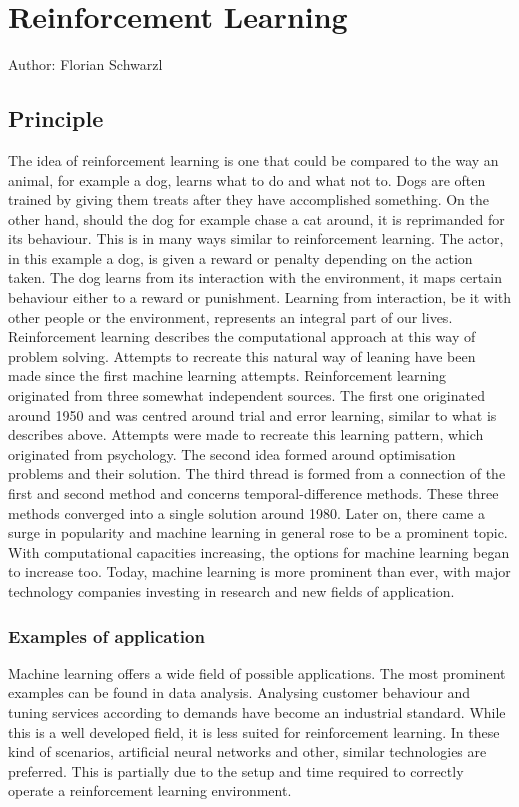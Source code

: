 \chapter{Reinforcement Learning}
Author: Florian Schwarzl

\section{Principle}
The idea of reinforcement learning is one that could be compared to the way an animal, for example a dog, learns what to do and what not to. Dogs are often trained by giving them treats after they have accomplished something. On the other hand, should the dog for example chase a cat around, it is reprimanded for its behaviour. This is in many ways similar to reinforcement learning. The actor, in this example a dog, is given a reward or penalty depending on the action taken. The dog learns from its interaction with the environment, it maps certain behaviour either to a reward or punishment. Learning from interaction, be it with other people or the environment, represents an integral part of our lives. Reinforcement learning describes the computational approach at this way of problem solving. Attempts to recreate this natural way of leaning have been made since the first machine learning attempts. Reinforcement learning originated from three somewhat independent sources. The first one originated around 1950 and was centred around trial and error learning, similar to what is describes above. Attempts were made to recreate this learning pattern, which originated from psychology. The second idea formed around optimisation problems and their solution. The third thread is formed from a connection of the first and second method and concerns temporal-difference methods. These three methods converged into a single solution around 1980. Later on, there came a surge in popularity and machine learning in general rose to be a prominent topic. With computational capacities increasing, the options for machine learning began to increase too. Today, machine learning is more prominent than ever, with major technology companies investing in research and new fields of application.  %

\subsection{Examples of application} %
Machine learning offers a wide field of possible applications. The most prominent examples can be found in data analysis. Analysing customer behaviour and tuning services according to demands have become an industrial standard. While this is a well developed field, it is less suited for reinforcement learning. In these kind of scenarios, artificial neural networks and other, similar technologies are preferred. This is partially due to the setup and time required to correctly operate a reinforcement learning environment.

